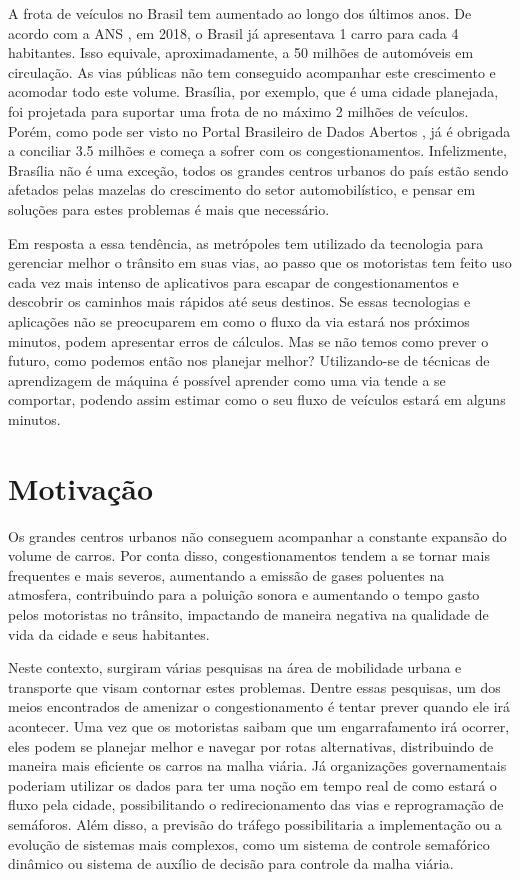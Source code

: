 A frota  de  veículos no Brasil tem aumentado ao longo  dos últimos anos. De acordo com a \acrfull{ANS} \cite{G1}, em 2018, o Brasil já apresentava 1 carro para cada 4 habitantes. Isso equivale, aproximadamente, a 50 milhões de automóveis em circulação. As vias públicas não tem conseguido acompanhar este crescimento e acomodar todo este volume. Brasília, por exemplo, que é uma cidade planejada, foi projetada para suportar uma frota de no máximo 2 milhões de veículos. Porém, como pode ser visto no Portal Brasileiro de Dados Abertos \cite{detran_2018}, já é obrigada a conciliar 3.5 milhões e começa a sofrer com os congestionamentos. Infelizmente, Brasília não é uma exceção, todos os grandes centros urbanos do país estão sendo afetados pelas mazelas do crescimento do setor automobilístico, e pensar em soluções para estes problemas é mais que necessário.


Em resposta a essa tendência, as metrópoles tem utilizado da tecnologia para gerenciar melhor o trânsito em suas vias, ao passo que os motoristas tem feito uso cada vez mais intenso de aplicativos para escapar de congestionamentos e descobrir os caminhos mais rápidos até seus destinos. Se essas tecnologias e aplicações não se preocuparem em como o fluxo da via estará nos próximos minutos, podem apresentar erros de cálculos. Mas se não temos como prever o futuro, como podemos então nos planejar melhor? Utilizando-se de técnicas de aprendizagem de máquina é possível aprender como uma via tende a se comportar, podendo assim estimar como o seu fluxo de veículos estará em alguns minutos.

\section{Motivação}

Os grandes centros urbanos não conseguem acompanhar a constante expansão do volume de carros. Por conta disso, congestionamentos tendem a se tornar mais frequentes e mais severos, aumentando a emissão de gases poluentes na atmosfera, contribuindo para a poluição sonora e aumentando o tempo gasto pelos motoristas no trânsito, impactando de maneira negativa na qualidade de vida da cidade e seus habitantes.

Neste contexto, surgiram várias pesquisas na área de mobilidade urbana e transporte que visam contornar estes problemas. Dentre essas pesquisas, um dos meios encontrados de amenizar o congestionamento é tentar prever quando ele irá acontecer. Uma vez que os motoristas saibam que um engarrafamento irá ocorrer, eles podem se planejar melhor e navegar por rotas alternativas, distribuindo de maneira mais eficiente os carros na malha viária. Já organizações governamentais poderiam utilizar os dados para ter uma noção em tempo real de como estará o fluxo pela cidade, possibilitando o redirecionamento das vias e reprogramação de semáforos. Além disso, a previsão do tráfego possibilitaria a implementação ou a evolução de sistemas mais complexos, como um sistema de controle semafórico dinâmico ou sistema de auxílio de decisão para controle da malha viária.

